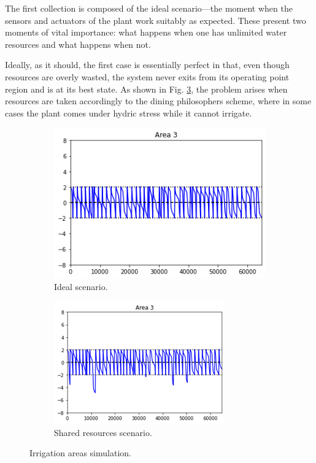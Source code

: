\documentclass[12pt]{article}
\begin{document}
The first collection is composed of the ideal scenario—the moment when the sensors and actuators of the plant work suitably as expected. These present two moments of vital importance: what happens when one has unlimited water resources and what happens when not.

Ideally, as it should, the first case is essentially perfect in that, even though resources are overly wasted, the system never exits from its operating point region and is at its best state. As shown in Fig. \ref{fig:areas_1}, the problem arises when resources are taken accordingly to the dining philosophers scheme, where in some cases the plant comes under hydric stress while it cannot irrigate.

\begin{figure}[ht]
\centering

\begin{subfigure}[b]{0.475\textwidth}
\centering
\includegraphics[width=\textwidth]{area_ideal}
\caption{Ideal scenario.}
\label{fig:area_ideal}
\end{subfigure}
\hfill
\begin{subfigure}[b]{0.475\textwidth}
\centering
\includegraphics[width=\textwidth]{area_mutex}
\caption{Shared resources scenario.}
\label{fig:area_mutex}
\end{subfigure}

\caption{Irrigation areas simulation.}
\label{fig:areas_1}
\end{figure}
\end{document}
